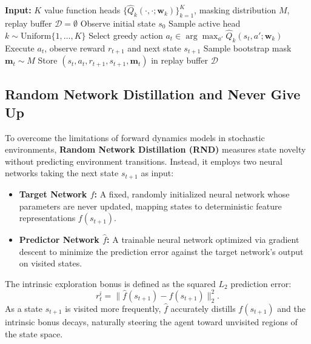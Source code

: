 \documentclass[10pt, a4paper]{report}
\begin{document}
\begin{algorithm}[H]
\caption{Bootstrapped DQN}
\begin{algorithmic}[1]
    \State \textbf{Input:} $K$ value function heads $\{\hat{Q}_k(\cdot, \cdot; \mathbf{w}_k)\}_{k=1}^K$, masking distribution $M$, replay buffer $\mathcal{D} = \emptyset$
        \State Observe initial state $s_0$
        \State Sample active head $k \sim \text{Uniform}\{1, \dots, K\}$
            \State Select greedy action $a_t \in \arg\max_{a'} \hat{Q}_k(s_t, a'; \mathbf{w}_k)$
            \State Execute $a_t$, observe reward $r_{t+1}$ and next state $s_{t+1}$
            \State Sample bootstrap mask $\mathbf{m}_t \sim M$
            \State Store $(s_t, a_t, r_{t+1}, s_{t+1}, \mathbf{m}_t)$ in replay buffer $\mathcal{D}$
        \EndFor
    \EndFor
\end{algorithmic}
\end{algorithm}
\subsection{Random Network Distillation and Never Give Up}

To overcome the limitations of forward dynamics models in stochastic environments, \textbf{Random Network Distillation (RND)} measures state novelty without predicting environment transitions. Instead, it employs two neural networks taking the next state $s_{t+1}$ as input:
\begin{itemize}
    \item \textbf{Target Network $f$:} A fixed, randomly initialized neural network whose parameters are never updated, mapping states to deterministic feature representations $f(s_{t+1})$.
    \item \textbf{Predictor Network $\hat{f}$:} A trainable neural network optimized via gradient descent to minimize the prediction error against the target network's output on visited states.
\end{itemize}
The intrinsic exploration bonus is defined as the squared $L_2$ prediction error:
\[
    r_t^i = \big\| \hat{f}(s_{t+1}) - f(s_{t+1}) \big\|_2^2.
\]
As a state $s_{t+1}$ is visited more frequently, $\hat{f}$ accurately distills $f(s_{t+1})$ and the intrinsic bonus decays, naturally steering the agent toward unvisited regions of the state space.
\end{document}
